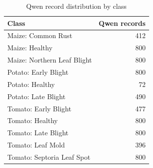 \documentclass{article}
\begin{document}
\begin{table}[htbp]
  \centering
  \caption{Qwen record distribution by class}
  \label{tab:class_distribution}
  \begin{tabular}{lr}
    \toprule
    \textbf{Class} & \textbf{Qwen records} \\
    \midrule
    Maize: Common Rust & 412 \\
    Maize: Healthy & 800 \\
    Maize: Northern Leaf Blight & 800 \\
    Potato: Early Blight & 800 \\
    Potato: Healthy & 72 \\
    Potato: Late Blight & 490 \\
    Tomato: Early Blight & 477 \\
    Tomato: Healthy & 800 \\
    Tomato: Late Blight & 800 \\
    Tomato: Leaf Mold & 396 \\
    Tomato: Septoria Leaf Spot & 800 \\
    \bottomrule
  \end{tabular}
\end{table}
\end{document}
